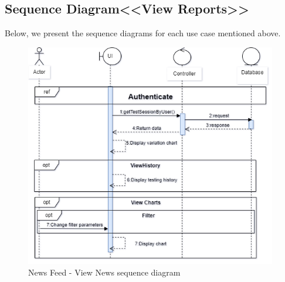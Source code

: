 \newpage

\subsection{Sequence Diagram<<View Reports>> }
Below, we present the sequence diagrams for each use case mentioned above.

\begin{figure}[H]
   
    
    \includegraphics[width=0.98\textwidth]{images/sprint2/reportsSeq.png}
    \caption{News Feed - View News sequence diagram}
    \label{fig:enter-label}
    
\end{figure}
\newpage
